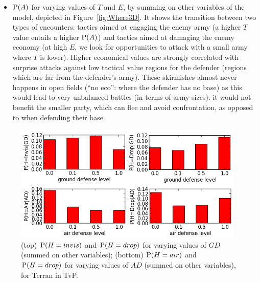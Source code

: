 \begin{itemize}
    \item $\mathrm{P}(A)$ for varying values of $T$ and $E$, by summing on other variables of the model, depicted in Figure~\ref{fig:Where3D}. 
It shows the transition between two types of encounters: tactics aimed at engaging the enemy army (a higher $T$ value entails a higher $\mathrm{P}(A)$) and tactics aimed at damaging the enemy economy (at high $E$, we look for opportunities to attack with a small army where $T$ is lower). Higher economical values are strongly correlated with surprise attacks against low tactical value regions for the defender (regions which are far from the defender's army). These skirmishes almost never happens in open fields (``no eco'': where the defender has no base) as this would lead to very unbalanced battles (in terms of army sizes): it would not benefit the smaller party, which can flee and avoid confrontation, as opposed to when defending their base.
\end{itemize}

\begin{figure}[!h]
\centerline{\includegraphics[width=11cm]{images/Terran_Prob_H_crop.png}}
\caption{(top) $\mathrm{P}(H=invis)$ and $\mathrm{P}(H=drop)$ for varying values of $GD$ (summed on other variables); (bottom) $\mathrm{P}(H=air)$ and $\mathrm{P}(H=drop)$ for varying values of $AD$ (summed on other variables), for Terran in TvP. %
}
\label{fig:P_H_AD}
\end{figure}

